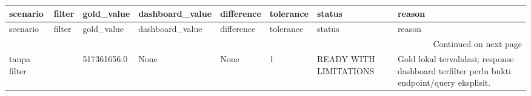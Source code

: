\begingroup
\scriptsize
\begin{longtable}{llllllll}
\toprule
scenario & filter & gold_value & dashboard_value & difference & tolerance & status & reason \\
\midrule
\endfirsthead
\toprule
scenario & filter & gold_value & dashboard_value & difference & tolerance & status & reason \\
\midrule
\endhead
\midrule
\multicolumn{8}{r}{Continued on next page} \\
\midrule
\endfoot
\bottomrule
\endlastfoot
tanpa filter & {} & 517361656.0 & None & None & 1 & READY WITH LIMITATIONS & Gold lokal tervalidasi; response dashboard terfilter perlu bukti endpoint/query eksplisit. \\
\end{longtable}
\endgroup
